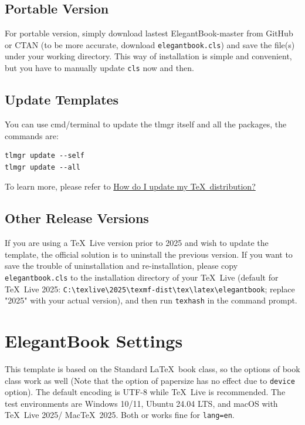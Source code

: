 \documentclass[11pt]{elegantbook}
\begin{document}
\section{Portable Version}
For portable version, simply download lastest ElegantBook-master from GitHub or CTAN (to be more accurate, download \lstinline{elegantbook.cls}) and save the file(s) under your working directory. This way of installation is simple and convenient, but you have to manually update \lstinline{cls} now and then.


\section{Update Templates}
You can use cmd/terminal to update the tlmgr itself and all the packages, the commands are:
\begin{lstlisting}
tlmgr update --self
tlmgr update --all
\end{lstlisting}

To learn more, please refer to \href{https://tex.stackexchange.com/questions/55437/how-do-i-update-my-tex-distribution}{How do I update my \TeX\ distribution?}

\section{Other Release Versions}

If you are using a \TeX~Live version prior to 2025 and wish to update the template, the official solution is to uninstall the previous version.
If you want to save the trouble of uninstallation and re-installation, please copy \lstinline{elegantbook.cls} to the installation directory of your \TeX~Live (default for \TeX~Live 2025: \lstinline|C:\texlive\2025\texmf-dist\tex\latex\elegantbook|; replace "2025" with your actual version), and then run \lstinline{texhash} in the command prompt.

\chapter{ElegantBook Settings}

This template is based on the Standard \LaTeX\ book class, so the options of book class work as well (Note that the option of papersize has no effect due to \lstinline{device} option). The default encoding is UTF-8 while \TeX~Live is recommended. The test environments are Windows 10/11, Ubuntu 24.04 LTS, and macOS with \TeX~Live 2025/ Mac\TeX\ 2025. Both  or  works fine for \lstinline{lang=en}.
\end{document}
